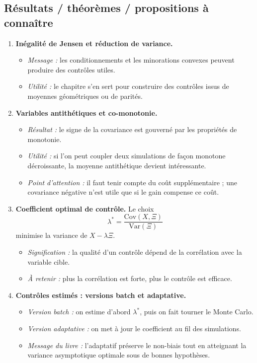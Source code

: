\documentclass[11pt,a4paper]{article}
\newcommand{\mc}{Monte Carlo}
\begin{document}
\subsection{Résultats / théorèmes / propositions à connaître}

\begin{enumerate}[label=\textbf{\arabic*.}]
  \item \textbf{Inégalité de Jensen et réduction de variance.}
  \begin{itemize}
    \item \emph{Message :} les conditionnements et les minorations convexes peuvent produire des contrôles utiles.
    \item \emph{Utilité :} le chapitre s'en sert pour construire des contrôles issus de moyennes géométriques ou de parités.
  \end{itemize}

  \item \textbf{Variables antithétiques et co-monotonie.}
  \begin{itemize}
    \item \emph{Résultat :} le signe de la covariance est gouverné par les propriétés de monotonie.
    \item \emph{Utilité :} si l'on peut coupler deux simulations de façon monotone décroissante, la moyenne antithétique devient intéressante.
    \item \emph{Point d'attention :} il faut tenir compte du coût supplémentaire ; une covariance négative n'est utile que si le gain compense ce coût.
  \end{itemize}

  \item \textbf{Coefficient optimal de contrôle.} Le choix
  \[
    \lambda^\ast=\frac{\mathrm{Cov}(X,\Xi)}{\mathrm{Var}(\Xi)}
  \]
  minimise la variance de $X-\lambda\Xi$.
  \begin{itemize}
    \item \emph{Signification :} la qualité d'un contrôle dépend de la corrélation avec la variable cible.
    \item \emph{À retenir :} plus la corrélation est forte, plus le contrôle est efficace.
  \end{itemize}

  \item \textbf{Contrôles estimés : versions batch et adaptative.}
  \begin{itemize}
    \item \emph{Version batch :} on estime d'abord $\lambda^\ast$, puis on fait tourner le \mc.
    \item \emph{Version adaptative :} on met à jour le coefficient au fil des simulations.
    \item \emph{Message du livre :} l'adaptatif préserve le non-biais tout en atteignant la variance asymptotique optimale sous de bonnes hypothèses.
  \end{itemize}


\end{enumerate}
\end{document}

